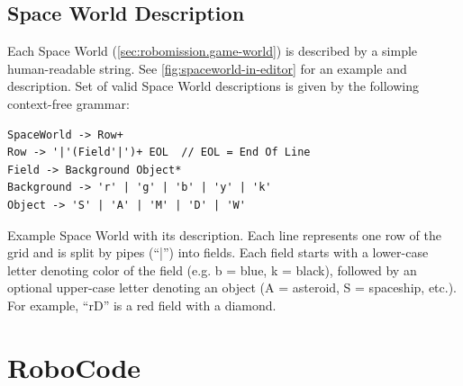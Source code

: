 \subsection{Space World Description}
\label{sec:impl.spaceworld}

Each Space World (\cref{sec:robomission.game-world}) is described by a simple
human-readable string.
See \cref{fig:spaceworld-in-editor} for an example and description.
Set of valid Space World descriptions is given by the
following context-free grammar:

\begin{lstlisting}
SpaceWorld -> Row+
Row -> '|'(Field'|')+ EOL  // EOL = End Of Line
Field -> Background Object*
Background -> 'r' | 'g' | 'b' | 'y' | 'k'
Object -> 'S' | 'A' | 'M' | 'D' | 'W'
\end{lstlisting}




%
{Example Space World with its description. %
Each line represents one row of the grid
and is split by pipes (``|'') into fields.
Each field starts with a lower-case letter denoting color of the field
(e.g. b = blue, k = black),
followed by an optional upper-case letter denoting an object
(A = asteroid, S = spaceship, etc.).
For example, ``rD'' is a red field with a diamond.}



\section{RoboCode}
\label{sec:robocode}

